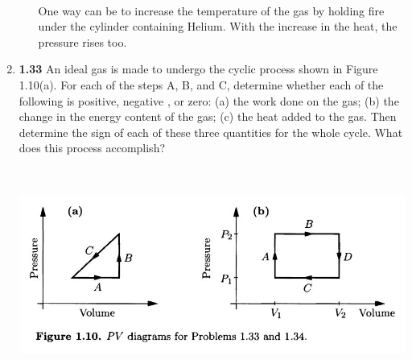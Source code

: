 \documentclass[fleqn]{article}
\begin{document}
\begin{enumerate}
\begin{enumerate}
        \textcolor{hwColor}{
          \\
          One way can be to increase the temperature of the gas by holding fire under the cylinder containing Helium. With 
          the increase in the heat, the pressure rises too.
        }

    \end{enumerate}

    \pagebreak

    \item \textbf{1.33} An ideal gas is made to undergo the cyclic process shown in Figure 1.10(a). For
    each of the steps A, B, and C, determine whether each of the following is positive, negative , or zero: 
    (a) the work done on the gas; (b) the change in the energy content of the gas; (c) the heat added to the gas. 
    Then determine the sign of each of these three quantities for the whole cycle. What does this process accomplish?

    \begin{center}
      \includegraphics[height=7cm, width=16cm]{1.JPG}
    \end{center}


\end{enumerate}
\end{document}
